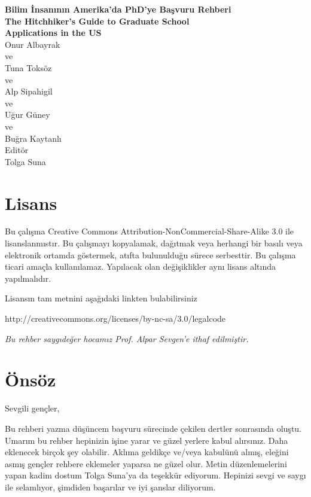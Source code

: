 \documentclass[12pt,a4paper]{article}
\begin{document}
%
%
\thispagestyle{empty}
\setcounter{page}{0}
\begin{center}
\textbf{\Huge{Bilim İnsanının Amerika'da PhD'ye Başvuru Rehberi} \\
\vspace{8mm}
\Large{The Hitchhiker's Guide to Graduate School \\
\vspace{4mm}
Applications in the US }}\\

\vspace{74mm}
\large{Onur Albayrak} 
\\
ve
\\
Tuna Toksöz 
\\
ve 
\\
Alp Sipahigil 
\\
ve 
\\
Uğur Güney 
\\
ve
\\
Buğra Kaytanlı \\
\vspace{6mm}
\small{
Editör 
\\
Tolga Suna }
\end{center}
%
%
\section*{Lisans}

Bu çalışma Creative Commons Attribution-NonCommercial-Share-Alike 3.0 ile lisanslanmıstır. Bu çalışmayı kopyalamak, dağıtmak veya herhangi bir basılı veya elektronik ortamda göstermek, atıfta bulunulduğu sürece serbesttir. Bu çalışma ticari amaçla kullanılamaz. Yapılacak olan değişiklikler aynı lisans altında yapılmalıdır. 

Lisansın tam metnini aşağıdaki linkten bulabilirsiniz

http://creativecommons.org/licenses/by-nc-sa/3.0/legalcode

\byncsa
\newpage
%
%
\vspace*{45mm} 
\textit{Bu rehber saygıdeğer hocamız Prof. Alpar Sevgen'e ithaf edilmiştir.}
%
\newpage
%
%
\tableofcontents
%
\newpage

%
%
\section{Önsöz}
Sevgili gençler, 

Bu rehberi yazma düşüncem başvuru sürecinde çekilen dertler sonrasında oluştu. Umarım bu rehber hepinizin işine yarar ve güzel yerlere kabul alırsınız. Daha eklenecek birçok şey olabilir. Aklıma geldikçe ve/veya kabulünü almış, eleğini asmış gençler rehbere eklemeler yaparsa ne güzel olur. Metin düzenlemelerini yapan kadim dostum Tolga Suna'ya da teşekkür ediyorum. Hepinizi sevgi ve saygı ile selamlıyor, şimdiden başarılar ve iyi şanslar diliyorum. 
\end{document}
